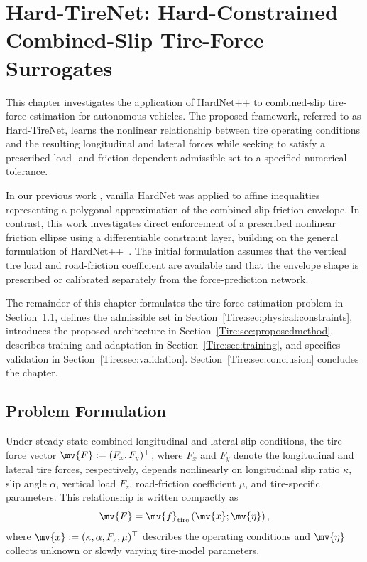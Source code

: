 \chapter{Hard-TireNet: Hard-Constrained Combined-Slip Tire-Force Surrogates}
\label{Tire:chap:Hard-TireNet}

This chapter investigates the application of HardNet++ to combined-slip
tire-force estimation for autonomous vehicles. The proposed framework, referred
to as Hard-TireNet, learns the nonlinear relationship between tire operating
conditions and the resulting longitudinal and lateral forces while seeking to
satisfy a prescribed load- and friction-dependent admissible set to a specified
numerical tolerance.

In our previous work , vanilla HardNet was applied to
affine inequalities representing a polygonal approximation of the combined-slip
friction envelope. In contrast, this work investigates direct enforcement of a
prescribed nonlinear friction ellipse using a differentiable constraint layer,
building on the general formulation of HardNet++~\cite{Goertzen:2026aa}. The
initial formulation assumes that the vertical tire load and road-friction
coefficient are available and that the envelope shape is prescribed or
calibrated separately from the force-prediction network.

The remainder of this chapter formulates the tire-force estimation problem in
Section~\ref{Tire:sec:problem:formulation}, defines the admissible set in
Section~\ref{Tire:sec:physical:constraints}, introduces the proposed
architecture in Section~\ref{Tire:sec:proposedmethod}, describes training and
adaptation in Section~\ref{Tire:sec:training}, and specifies validation in
Section~\ref{Tire:sec:validation}. Section~\ref{Tire:sec:conclusion} concludes
the chapter.

\section{Problem Formulation}
\label{Tire:sec:problem:formulation}

Under steady-state combined longitudinal and lateral slip conditions, the
tire-force vector $\mv{F}:=(F_x,F_y)^\top$, where $F_x$ and $F_y$ denote the
longitudinal and lateral tire forces, respectively, depends nonlinearly on
longitudinal slip ratio $\kappa$, slip angle $\alpha$, vertical load $F_z$,
road-friction coefficient $\mu$, and tire-specific parameters. This
relationship is written compactly as
%
\begin{equation}
	\label{Tire:eq:force:map}
	\mv{F}
	=
	\mv{f}_{\mathrm{tire}}
	\left(
	\mv{x};\mv{\eta}
	\right)
	,
\end{equation}
where $\mv{x}:=(\kappa,\alpha,F_z,\mu)^\top$ describes the operating
conditions and $\mv{\eta}$ collects unknown or slowly varying tire-model
parameters.


